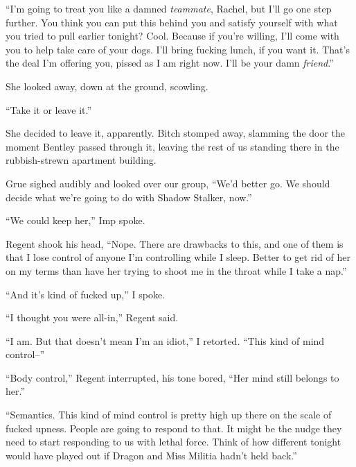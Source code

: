 ``I'm going to treat you like a damned \emph{teammate}, Rachel, but I'll go one step further.  You think you can put this behind you and satisfy yourself with what you tried to pull earlier tonight?  Cool.  Because if you're willing, I'll come with you to help take care of your dogs.  I'll bring fucking lunch, if you want it.  That's the deal I'm offering you, pissed as I am right now.  I'll be your damn \emph{friend}.''



She looked away, down at the ground, scowling.



``Take it or leave it.''



She decided to leave it, apparently.  Bitch stomped away, slamming the door the moment Bentley passed through it, leaving the rest of us standing there in the rubbish-strewn apartment building.



Grue sighed audibly and looked over our group, ``We'd better go.  We should decide what we're going to do with Shadow Stalker, now.''



``We could keep her,'' Imp spoke.



Regent shook his head, ``Nope.  There are drawbacks to this, and one of them is that I lose control of anyone I'm controlling while I sleep.  Better to get rid of her on my terms than have her trying to shoot me in the throat while I take a nap.''



``And it's kind of fucked up,'' I spoke.



``I thought you were all-in,'' Regent said.



``I am.  But that doesn't mean I'm an idiot,'' I retorted.  ``This kind of mind control--''



``Body control,'' Regent interrupted, his tone bored, ``Her mind still belongs to her.''



``Semantics.  This kind of mind control is pretty high up there on the scale of fucked upness.  People are going to respond to that.  It might be the nudge they need to start responding to us with lethal force.  Think of how different tonight would have played out if Dragon and Miss Militia hadn't held back.''



